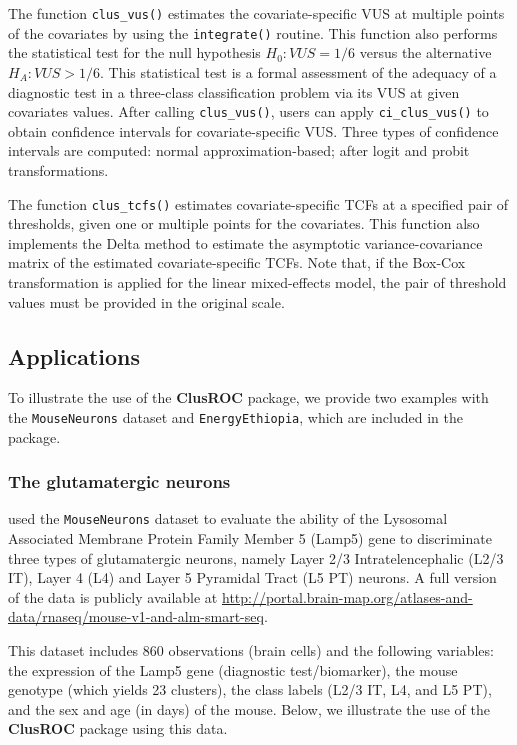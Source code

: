 The function {\texttt{clus\_vus()}} estimates the covariate-specific VUS at multiple points of the covariates by using the \texttt{integrate()} routine. This function also performs the statistical test for the null hypothesis $H_0: VUS = 1/6$ versus the alternative $H_A: VUS > 1/6$. This statistical test is a formal assessment of the adequacy of a diagnostic test in a three-class classification problem via its VUS at given covariates values. After calling {\texttt{clus\_vus()}}, users can apply {\texttt{ci\_clus\_vus()}} to obtain confidence intervals for covariate-specific VUS. Three types of confidence intervals are computed: normal approximation-based; after logit and probit transformations.

The function {\texttt{clus\_tcfs()}} estimates covariate-specific TCFs at a specified pair of thresholds, given one or multiple points for the covariates. This function also implements the Delta method to estimate the asymptotic variance-covariance matrix of the estimated covariate-specific TCFs. Note that, if the Box-Cox transformation is applied for the linear {mixed-effects} model, the pair of threshold values must be provided in the original scale.

\hypertarget{applications}{%
\subsection{Applications}\label{applications}}

{To illustrate the use of the \textbf{ClusROC} package, we provide two examples with the \texttt{MouseNeurons} dataset and \texttt{EnergyEthiopia}, which are included in the package.}

\hypertarget{the-glutamatergic-neurons}{%
\subsubsection{The glutamatergic
neurons}\label{the-glutamatergic-neurons}}

\citet{khanh2022} used the \texttt{MouseNeurons} dataset to evaluate the ability of the Lysosomal Associated Membrane Protein Family Member 5 (Lamp5) gene to discriminate three types of glutamatergic neurons, namely Layer 2/3 Intratelencephalic (L2/3 IT), Layer 4 (L4) and Layer 5 Pyramidal Tract (L5 PT) neurons. A full version of the data is publicly available at \url{http://portal.brain-map.org/atlases-and-data/rnaseq/mouse-v1-and-alm-smart-seq}.

This dataset includes 860 observations (brain cells) and the following variables: the expression of the Lamp5 gene (diagnostic test/biomarker), the mouse genotype (which yields 23 clusters), the class labels (L2/3 IT, L4, and L5 PT), and the sex and age (in days) of the mouse. Below, we illustrate the use of the \textbf{ClusROC} package using this data.

